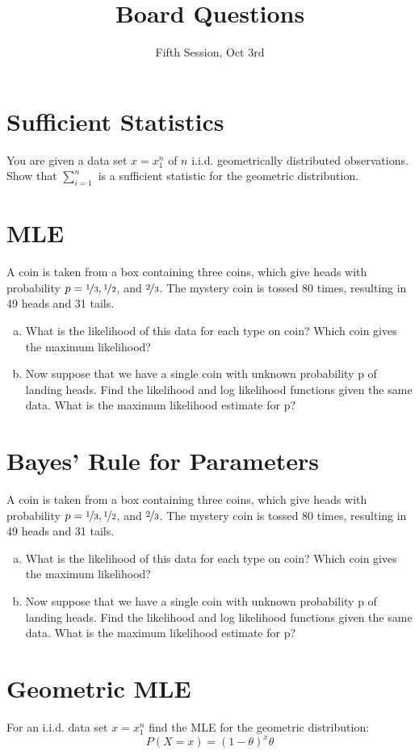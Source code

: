 \documentclass[11p,a4paper]{article}
\title{Board Questions}
\date{Fifth Session, Oct 3rd}
\begin{document}
\maketitle

\section{Sufficient Statistics}
You are given a data set $ x=x_{1}^{n} $ of $ n $ i.i.d. geometrically distributed observations.
Show that $ \sum_{i=1}^{n} $ is a sufficient statistic for the geometric distribution.

\section{MLE}
A coin is taken from a box containing three coins, which give heads
with probability $ p = \nicefrac{1}{3} , \nicefrac{1}{2} $, and $ \nicefrac{2}{3}$. The mystery coin is 
tossed 80 times, resulting in 49 heads and 31 tails.
\begin{enumerate}[a)]
\item What is the likelihood of this data for each type on coin? Which
coin gives the maximum likelihood?
\item Now suppose that we have a single coin with unknown probability
p of landing heads. Find the likelihood and log likelihood functions
given the same data. What is the maximum likelihood estimate for p?
\end{enumerate}

\section{Bayes' Rule for Parameters}
A coin is taken from a box containing three coins, which give heads
with probability $ p = \nicefrac{1}{3} , \nicefrac{1}{2} $, and $ \nicefrac{2}{3}$. The mystery coin is 
tossed 80 times, resulting in 49 heads and 31 tails.
\begin{enumerate}[a)]
\item What is the likelihood of this data for each type on coin? Which
coin gives the maximum likelihood?
\item Now suppose that we have a single coin with unknown probability
p of landing heads. Find the likelihood and log likelihood functions
given the same data. What is the maximum likelihood estimate for p?
\end{enumerate}

\section{Geometric MLE}
For an i.i.d. data set $ x = x_{1}^{n} $ find the MLE for the geometric distribution:
$$ P(X=x) = (1-\theta)^{x}\theta $$
\end{document}
